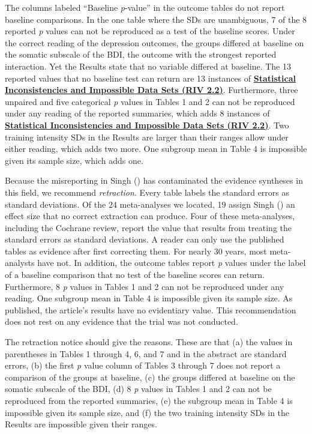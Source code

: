 \documentclass[
  letterpaper,
  DIV=11,
  numbers=noendperiod]{scrartcl}
\begin{document}
The columns labeled ``Baseline \emph{p}-value'' in the outcome tables do
not report baseline comparisons. In the one table where the SDs are
unambiguous, 7 of the 8 reported \emph{p} values can not be reproduced
as a test of the baseline scores. Under the correct reading of the
depression outcomes, the groups differed at baseline on the somatic
subscale of the BDI, the outcome with the strongest reported
interaction. Yet the Results state that no variable differed at
baseline. The 13 reported values that no baseline test can return are 13
instances of
\href{https://auditclinicalevidence.org/riv.html#riv-2-2}{\textcolor{acerivblue}{\textbf{Statistical Inconsistencies and Impossible Data Sets (RIV 2.2)}}}.
Furthermore, three unpaired and five categorical \emph{p} values in
Tables 1 and 2 can not be reproduced under any reading of the reported
summaries, which adds 8 instances of
\href{https://auditclinicalevidence.org/riv.html#riv-2-2}{\textcolor{acerivblue}{\textbf{Statistical Inconsistencies and Impossible Data Sets (RIV 2.2)}}}.
Two training intensity SDs in the Results are larger than their ranges
allow under either reading, which adds two more. One subgroup mean in
Table 4 is impossible given its sample size, which adds one.

Because the misreporting in Singh () has
contaminated the evidence syntheses in this field, we recommend
\emph{retraction}. Every table labels the standard errors as standard
deviations. Of the 24 meta-analyses we located, 19 assign Singh
() an effect size that no correct
extraction can produce. Four of these meta-analyses, including the
Cochrane review, report the value that results from treating the
standard errors as standard deviations. A reader can only use the
published tables as evidence after first correcting them. For nearly 30
years, most meta-analysts have not. In addition, the outcome tables
report \emph{p} values under the label of a baseline comparison that no
test of the baseline scores can return. Furthermore, 8 \emph{p} values
in Tables 1 and 2 can not be reproduced under any reading. One subgroup
mean in Table 4 is impossible given its sample size. As published, the
article's results have no evidentiary value. This recommendation does
not rest on any evidence that the trial was not conducted.

The retraction notice should give the reasons. These are that (a) the
values in parentheses in Tables 1 through 4, 6, and 7 and in the
abstract are standard errors, (b) the first \emph{p} value column of
Tables 3 through 7 does not report a comparison of the groups at
baseline, (c) the groups differed at baseline on the somatic subscale of
the BDI, (d) 8 \emph{p} values in Tables 1 and 2 can not be reproduced
from the reported summaries, (e) the subgroup mean in Table 4 is
impossible given its sample size, and (f) the two training intensity SDs
in the Results are impossible given their ranges.
\end{document}
